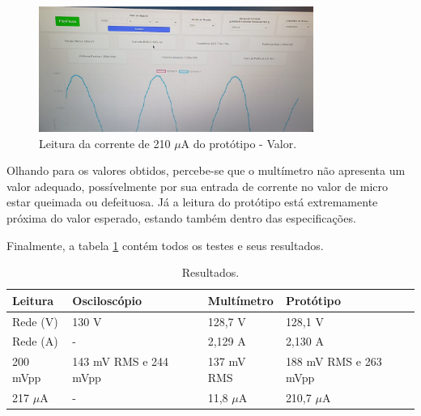 \begin{figure}[htb!]
    \caption{Leitura da corrente de 210 $\mu$A do protótipo - Valor.}
    \label{fig:leitura-micro-boy-valor}
    \includegraphics[width=0.8\textwidth]{figuras/leitura-micro-boy-valor.png}
    \fonte{}
\end{figure}

Olhando para os valores obtidos, percebe-se que o multímetro não apresenta um valor adequado, possívelmente por sua entrada de corrente no valor de micro estar queimada ou defeituosa. Já a leitura do protótipo está extremamente próxima do valor esperado, estando também dentro das especificações.

Finalmente, a tabela \ref{tab:resultados} contém todos os testes e seus resultados.

\begin{table}[!ht]
    \centering
    \caption{Resultados.}
    \label{tab:resultados}
    \begin{tabular}{|l|l|l|l|}
        \hline
        \textbf{Leitura} & \textbf{Osciloscópio} & \textbf{Multímetro} & \textbf{Protótipo}    \\ \hline
        Rede (V)         & 130 V                 & 128,7 V             & 128,1 V               \\ \hline
        Rede (A)         & -                     & 2,129 A             & 2,130 A               \\ \hline
        200 mVpp         & 143 mV RMS e 244 mVpp & 137 mV RMS          & 188 mV RMS e 263 mVpp \\ \hline
        217 $\mu$A       & -                     & 11,8 $\mu$A         & 210,7 $\mu$A          \\ \hline
    \end{tabular}
\end{table}
